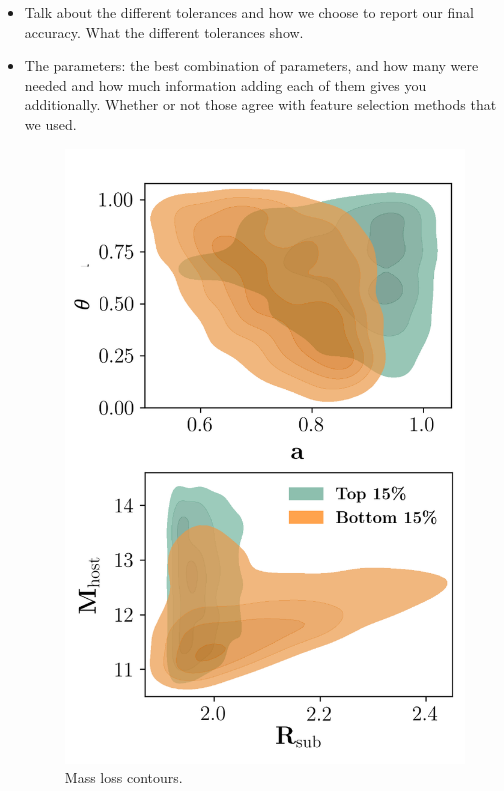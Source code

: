 \documentclass[fleqn,usenatbib]{mnras}
\begin{document}
\begin{itemize}
    \item Talk about the different tolerances and how we choose to report our final accuracy. What the different tolerances show.
	\item The parameters: the best combination of parameters, and how many were needed and how much information adding each of them gives you additionally. Whether or not those agree with feature selection methods that we used. 
\begin{figure}
	\includegraphics[width=\textwidth]{Figures/massloss_contours}
    \caption{Mass loss contours.}
    \label{fig:massloss_contours}
\end{figure}
\end{itemize}
\end{document}

